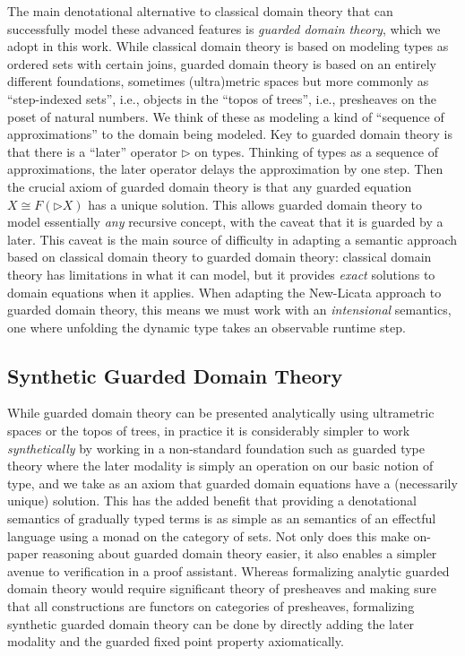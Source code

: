 The main denotational alternative to classical domain theory that can
successfully model these advanced features is \emph{guarded domain
theory}, which we adopt in this work. While classical domain theory is
based on modeling types as ordered sets with certain joins, guarded
domain theory is based on an entirely different foundations, sometimes
(ultra)metric spaces but more commonly as ``step-indexed sets'', i.e.,
objects in the ``topos of trees'', i.e., presheaves on the poset of
natural numbers. We think of these as modeling a kind of ``sequence of
approximations'' to the domain being modeled.
%
Key to guarded domain theory is that there is a ``later'' operator
$\triangleright$ on types. Thinking of types as a sequence of
approximations, the later operator delays the approximation by one
step. Then the crucial axiom of guarded domain theory is that any
guarded equation $X \cong F(\triangleright X)$ has a unique
solution. This allows guarded domain theory to model essentially
\emph{any} recursive concept, with the caveat that it is guarded by a
later.
%
This caveat is the main source of difficulty in adapting a semantic
approach based on classical domain theory to guarded domain theory:
classical domain theory has limitations in what it can model, but it
provides \emph{exact} solutions to domain equations when it
applies. When adapting the New-Licata approach to guarded domain
theory, this means we must work with an \emph{intensional} semantics,
one where unfolding the dynamic type takes an observable runtime step.

\subsection{Synthetic Guarded Domain Theory}

While guarded domain theory can be presented analytically using
ultrametric spaces or the topos of trees, in practice it is
considerably simpler to work \emph{synthetically} by working in a
non-standard foundation such as guarded type theory where the later
modality is simply an operation on our basic notion of type, and we
take as an axiom that guarded domain equations have a (necessarily
unique) solution. This has the added benefit that providing a
denotational semantics of gradually typed terms is as simple as an
semantics of an effectful language using a monad on the category of
sets. Not only does this make on-paper reasoning about guarded domain
theory easier, it also enables a simpler avenue to verification in a
proof assistant. Whereas formalizing analytic guarded domain theory
would require significant theory of presheaves and making sure that
all constructions are functors on categories of presheaves,
formalizing synthetic guarded domain theory can be done by directly
adding the later modality and the guarded fixed point property
axiomatically.

